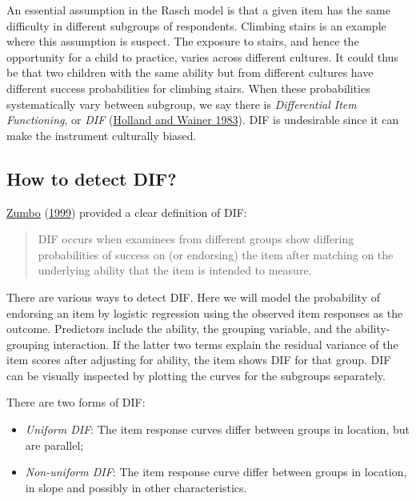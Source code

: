 \documentclass[
]{book}
\begin{document}
An essential assumption in the Rasch model is that a given item has the same difficulty in different subgroups of respondents. Climbing stairs is an example where this assumption is suspect. The exposure to stairs, and hence the opportunity for a child to practice, varies across different cultures. It could thus be that two children with the same ability but from different cultures have different success probabilities for climbing stairs. When these probabilities systematically vary between subgroup, we say there is \emph{Differential Item Functioning}, or \emph{DIF} (\protect\hyperlink{ref-holland1983}{Holland and Wainer 1983}). DIF is undesirable since it can make the instrument culturally biased.

\hypertarget{how-to-detect-dif}{%
\subsection{How to detect DIF?}\label{how-to-detect-dif}}

\protect\hyperlink{ref-zumbo1999}{Zumbo} (\protect\hyperlink{ref-zumbo1999}{1999}) provided a clear definition of DIF:

\begin{quote}
DIF occurs when examinees from different groups show differing probabilities of success on (or endorsing) the item after matching on the underlying ability that the item is intended to measure.
\end{quote}

There are various ways to detect DIF. Here we will model the probability of endorsing an item by logistic regression using the observed item responses as the outcome. Predictors include the ability, the grouping variable, and the ability-grouping interaction. If the latter two terms explain the residual variance of the item scores after adjusting for ability, the item shows DIF for that group. DIF can be visually inspected by plotting the curves for the subgroups separately.

There are two forms of DIF:

\begin{itemize}
\item
  \emph{Uniform DIF}: The item response curves differ between groups in location, but are parallel;
\item
  \emph{Non-uniform DIF}: The item response curve differ between groups in location, in slope and possibly in other characteristics.
\end{itemize}
\end{document}
